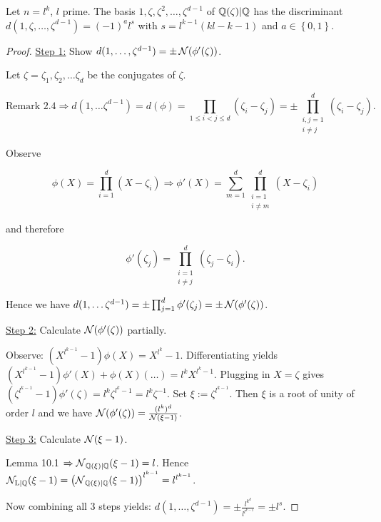 \begin{Prop}
	Let $n = l^k$, $l$ prime. The basis $1, \zeta, \zeta^2, \dots, \zeta^{d-1}$ of $\mathbb{Q}(\zeta) \vert \mathbb{Q}$ has the discriminant $d(1, \zeta, \dots, \zeta^{d-1}) = (-1)^a l^s$ with $s = l^{k-1}(kl -k -1)$ and $a \in \left\lbrace  0,1 \right\rbrace $.
\end{Prop}
\begin{proof}
	\underline{Step 1:} Show $d(1,\dots, \zeta^{d-1}) = \pm \operatorname{\mathcal{N}}(\phi'(\zeta))$. 
	
	Let $\zeta = \zeta_1, \zeta_2, \dots \zeta_d$ be the conjugates of $\zeta$. 
	
	\[
		\text{Remark 2.4} \Rightarrow d(1, \dots \zeta^{d-1}) = d(\phi) = \prod_{1 \leq i < j \leq d} (\zeta_i - \zeta_j) = \pm \prod_{\substack{i,j = 1 \\ i \neq j }}^d (\zeta_i - \zeta_j).
	\]
	
	Observe
	
	\[
		\phi(X) = \prod_{i=1}^d (X - \zeta_i) \Rightarrow \phi'(X) = \sum_{m=1}^d \prod_{\substack{i=1 \\ i \neq m}}^d (X - \zeta_i)
	\]
	
	and therefore
	
	\[
		\phi'(\zeta_j) = \prod_{\substack{i=1 \\ i \neq j}}^d (\zeta_j - \zeta_i).
	\]
	
	Hence we have $d(1, \dots \zeta^{d-1}) = \pm \prod_{j=1}^d \phi'(\zeta_j) = \pm \operatorname{\mathcal{N}} (\phi'(\zeta))$.
	
	\bigskip
	
	\underline{Step 2:} Calculate $\operatorname{\mathcal{N}}(\phi'(\zeta))$ partially.
	
	Observe: $(X^{l^{k-1}}-1)\phi(X) = X^{l^k}-1$. Differentiating yields $(X^{l^{k-1}}-1)\phi'(X) + \phi(X)(\dots) = l^k X^{l^k-1}$. Plugging in $X = \zeta$ gives $(\zeta^{l^{k-1}}-1)\phi'(\zeta) = l^k \zeta^{l^k-1} = l^k \zeta^{-1}$. Set $\xi := \zeta^{l^{k-1}}$. Then $\xi$ is a root of unity of order $l$ and we have $\operatorname{\mathcal{N}}(\phi'(\zeta)) = \frac{(l^k)^d}{\operatorname{\mathcal{N}}(\xi - 1)}$.
	
	\bigskip
	
	\underline{Step 3:} Calculate $\operatorname{\mathcal{N}}(\xi - 1)$.
	
	Lemma 10.1 $\Rightarrow \operatorname{\mathcal{N}}_{\mathbb{Q}(\xi) \vert \mathbb{Q}} (\xi - 1) = l$. Hence $\operatorname{\mathcal{N}_{L \vert \mathbb{Q}}} (\xi - 1) = \left(   \operatorname{\mathcal{N}}_{\mathbb{Q}(\xi) \vert \mathbb{Q}} (\xi - 1) \right) ^{l^{k-1}} = l^{l^{k-1}}$.
	
	Now combining all 3 steps yields: $d(1, \dots, \zeta^{d-1}) = \pm \frac{l^{k^d}}{l^{l^{k-1}}} = \pm l^s$.
\end{proof}

